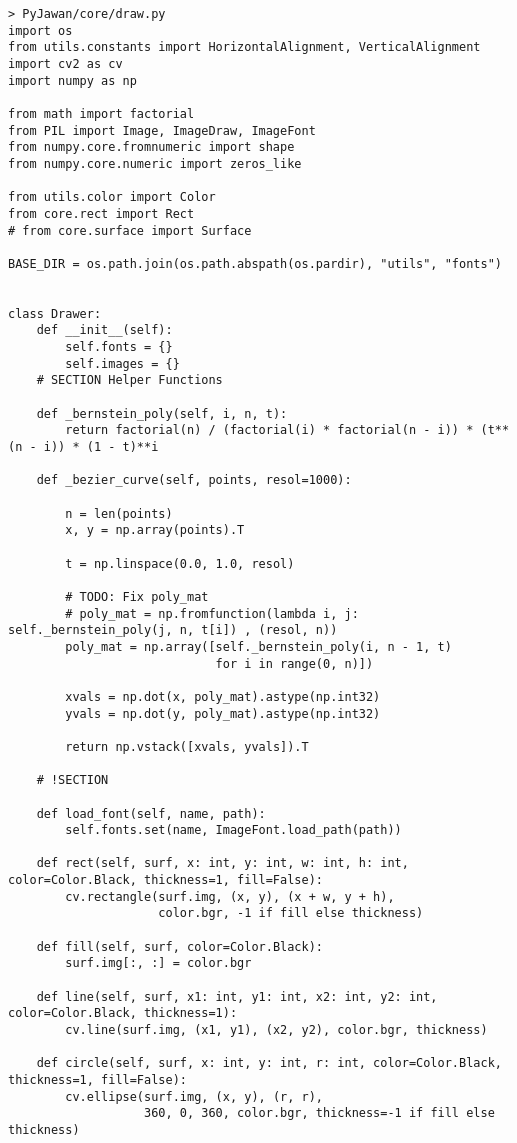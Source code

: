 \documentclass[11pt]{article}
\begin{document}
\begin{lstlisting}
> PyJawan/core/draw.py
import os
from utils.constants import HorizontalAlignment, VerticalAlignment
import cv2 as cv
import numpy as np

from math import factorial
from PIL import Image, ImageDraw, ImageFont
from numpy.core.fromnumeric import shape
from numpy.core.numeric import zeros_like

from utils.color import Color
from core.rect import Rect
# from core.surface import Surface

BASE_DIR = os.path.join(os.path.abspath(os.pardir), "utils", "fonts")


class Drawer:
    def __init__(self):
        self.fonts = {}
        self.images = {}
    # SECTION Helper Functions

    def _bernstein_poly(self, i, n, t):
        return factorial(n) / (factorial(i) * factorial(n - i)) * (t**(n - i)) * (1 - t)**i

    def _bezier_curve(self, points, resol=1000):

        n = len(points)
        x, y = np.array(points).T

        t = np.linspace(0.0, 1.0, resol)

        # TODO: Fix poly_mat
        # poly_mat = np.fromfunction(lambda i, j: self._bernstein_poly(j, n, t[i]) , (resol, n))
        poly_mat = np.array([self._bernstein_poly(i, n - 1, t)
                             for i in range(0, n)])

        xvals = np.dot(x, poly_mat).astype(np.int32)
        yvals = np.dot(y, poly_mat).astype(np.int32)

        return np.vstack([xvals, yvals]).T

    # !SECTION

    def load_font(self, name, path):
        self.fonts.set(name, ImageFont.load_path(path))

    def rect(self, surf, x: int, y: int, w: int, h: int, color=Color.Black, thickness=1, fill=False):
        cv.rectangle(surf.img, (x, y), (x + w, y + h),
                     color.bgr, -1 if fill else thickness)

    def fill(self, surf, color=Color.Black):
        surf.img[:, :] = color.bgr

    def line(self, surf, x1: int, y1: int, x2: int, y2: int, color=Color.Black, thickness=1):
        cv.line(surf.img, (x1, y1), (x2, y2), color.bgr, thickness)

    def circle(self, surf, x: int, y: int, r: int, color=Color.Black, thickness=1, fill=False):
        cv.ellipse(surf.img, (x, y), (r, r),
                   360, 0, 360, color.bgr, thickness=-1 if fill else thickness)


\end{lstlisting}
\end{document}
